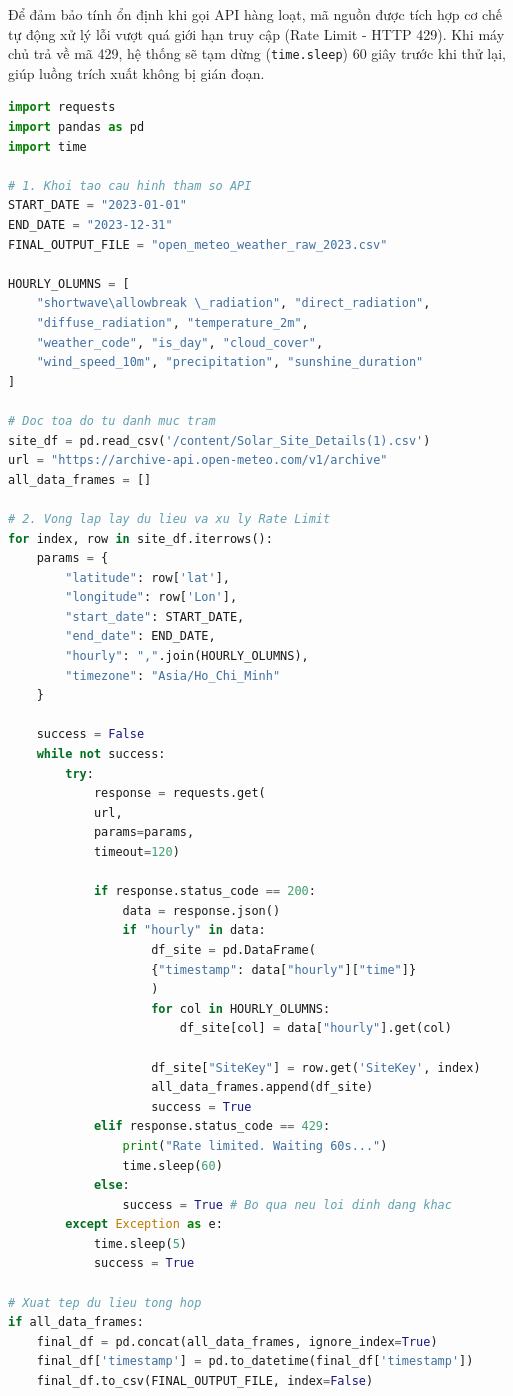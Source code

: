 \documentclass[12pt,a4paper]{article}
\begin{document}
Để đảm bảo tính ổn định khi gọi API hàng loạt, mã nguồn được tích hợp cơ chế tự động xử lý lỗi vượt quá giới hạn truy cập (Rate Limit - HTTP 429). Khi máy chủ trả về mã 429, hệ thống sẽ tạm dừng (\texttt{time.sleep}) 60 giây trước khi thử lại, giúp luồng trích xuất không bị gián đoạn.

\begin{lstlisting}[language=Python, caption={Mã nguồn Python trích xuất dữ liệu khí tượng từ Open-Meteo API}, label={lst:api_weather}]
import requests
import pandas as pd
import time

# 1. Khoi tao cau hinh tham so API
START_DATE = "2023-01-01"
END_DATE = "2023-12-31"
FINAL_OUTPUT_FILE = "open_meteo_weather_raw_2023.csv"

HOURLY_OLUMNS = [
    "shortwave\allowbreak \_radiation", "direct_radiation", 
    "diffuse_radiation", "temperature_2m", 
    "weather_code", "is_day", "cloud_cover",
    "wind_speed_10m", "precipitation", "sunshine_duration"
]

# Doc toa do tu danh muc tram
site_df = pd.read_csv('/content/Solar_Site_Details(1).csv')
url = "https://archive-api.open-meteo.com/v1/archive"
all_data_frames = []

# 2. Vong lap lay du lieu va xu ly Rate Limit
for index, row in site_df.iterrows():
    params = {
        "latitude": row['lat'],
        "longitude": row['Lon'],
        "start_date": START_DATE,
        "end_date": END_DATE,
        "hourly": ",".join(HOURLY_OLUMNS),
        "timezone": "Asia/Ho_Chi_Minh"
    }
    
    success = False
    while not success:
        try:
            response = requests.get(
            url, 
            params=params, 
            timeout=120)
            
            if response.status_code == 200:
                data = response.json()
                if "hourly" in data:
                    df_site = pd.DataFrame(
                    {"timestamp": data["hourly"]["time"]}
                    )
                    for col in HOURLY_OLUMNS:
                        df_site[col] = data["hourly"].get(col)
                    
                    df_site["SiteKey"] = row.get('SiteKey', index)
                    all_data_frames.append(df_site)
                    success = True
            elif response.status_code == 429:
                print("Rate limited. Waiting 60s...")
                time.sleep(60)
            else:
                success = True # Bo qua neu loi dinh dang khac
        except Exception as e:
            time.sleep(5)
            success = True

# Xuat tep du lieu tong hop
if all_data_frames:
    final_df = pd.concat(all_data_frames, ignore_index=True)
    final_df['timestamp'] = pd.to_datetime(final_df['timestamp'])
    final_df.to_csv(FINAL_OUTPUT_FILE, index=False)
\end{lstlisting}
\end{document}
